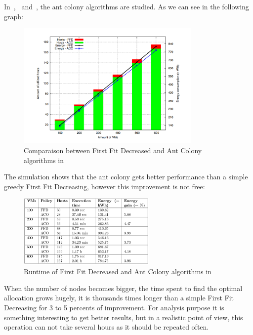 \documentclass[a4paper,11pt]{article}
\begin{document}
In~\cite{algo:antcolony1},~\cite{algo:antcolony2} and~\cite{algo:antcolony3}, the ant colony
algorithms are studied. As we can see in the following graph:

\begin{figure}[H]
\begin{center}
	\includegraphics[width=0.8\textwidth]{./images/antcolonyperf.png}
	\caption{Comparaison between First Fit Decreased and Ant Colony algorithms in~\cite{algo:antcolony2}}
\end{center}
\end{figure}

The simulation shows that the ant colony gets better performance than a simple greedy First
Fit Decreasing, however this improvement is not free:

\begin{figure}[H]
\begin{center}
	\includegraphics[width=0.6\textwidth]{./images/antcolonyruntime.png}
	\caption{Runtime of First Fit Decreased and Ant Colony algorithms in~\cite{algo:antcolony2}}
\end{center}
\end{figure}

When the number of nodes becomes bigger, the time spent to find the optimal
allocation grows hugely, it is thousands times longer than a simple First Fit
Decreasing for 3 to 5 percents of improvement. For analysis purpose it is
something interesting to get better results, but in a realistic point of view,
this operation can not take several hours as it should be repeated often.
\end{document}

